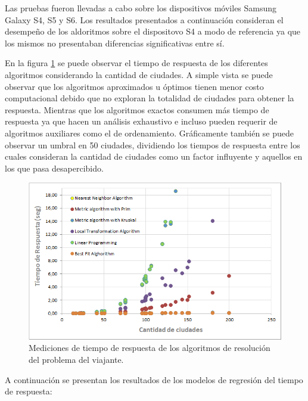 Las pruebas fueron llevadas a cabo sobre los dispositivos móviles
Samsung Galaxy S4, S5 y S6. Los resultados presentados a continuación
consideran el desempeño de los aldoritmos sobre el dispositovo S4
a modo de referencia ya que los mismos no presentaban diferencias
significativas entre sí.

En la figura \ref{tab:response-caso-de-estudio-2-1} se puede observar
el tiempo de respuesta de los diferentes algoritmos considerando la
cantidad de ciudades. A simple vista se puede observar que los algoritmos
aproximados u óptimos tienen menor costo computacional debido que
no exploran la totalidad de ciudades para obtener la respuesta. Mientras
que los algoritmos exactos consumen más tiempo de respuesta ya que
hacen un análisis exhaustivo e incluso pueden requerir de algoritmos
auxiliares como el de ordenamiento. Gráficamente también se puede
observar un umbral en 50 ciudades, dividiendo los tiempos de respuesta
entre los cuales consideran la cantidad de ciudades como un factor
influyente y aquellos en los que pasa desapercibido.

\begin{figure}[H]
\begin{centering}
\includegraphics[scale=0.6]{images/S4}
\par\end{centering}

\caption{Mediciones de tiempo de respuesta de los algoritmos de resolución
del problema del viajante. \label{tab:response-caso-de-estudio-2-1}}
\end{figure}


A continuación se presentan los resultados de los modelos de regresión
del tiempo de respuesta:

